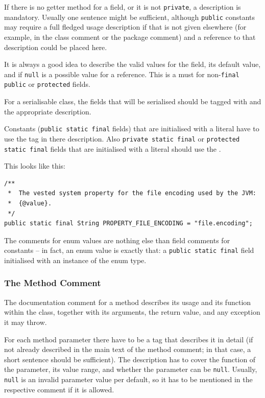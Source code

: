 \documentclass[11pt,a4paper, titlepage, parskip=half, headsepline, footsepline, cleardoublepage=current, headheight=1cm]{scrbook}
\begin{document}
If there is no getter method for a field, or it is not \lstinline|private|, a description is mandatory. Usually one sentence might be sufficient, although \lstinline|public| constants may require a full fledged usage description if that is not given elsewhere (for example, in the class comment or the package comment) and a reference to that description could be placed here.

It is always a good idea to describe the valid values for the field, its default value, and if \lstinline|null| is a possible value for a reference. This is a must for non-\lstinline|final| \lstinline|public| or \lstinline|protected| fields.

For a serialisable class, the fields that will be serialised should be tagged with  and the appropriate description.

Constants (\lstinline|public static final| fields) that are initialised with a literal have to use the  tag in there description. Also \lstinline|private static final| or \lstinline|protected static final| fields that are initialised with a literal should use the .

This looks like this:
\begin{lstlisting}
/**
 *  The vested system property for the file encoding used by the JVM:
 *  {@value}.
 */
public static final String PROPERTY_FILE_ENCODING = "file.encoding";
\end{lstlisting}

The comments for enum values are nothing else than field comments for constants – in fact, an enum value is exactly that: a \lstinline|public static final| field initialised with an instance of the enum type.

\subsubsection{The Method Comment}\label{sec:MethodComment}
The documentation comment for a method describes its usage and its function within the class, together with its arguments, the return value, and any exception it may throw.

For each method parameter there have to be a  tag that describes it in detail (if not already described in the main text of the method comment; in that case, a short sentence should be sufficient). The description has to cover the function of the parameter, its value range, and whether the parameter can be \lstinline|null|. Usually, \lstinline|null| is an invalid parameter value per default, so it has to be mentioned in the respective comment if it is allowed.
\end{document}
